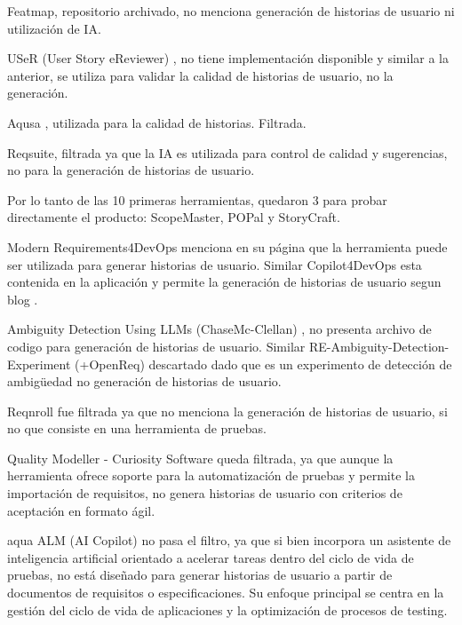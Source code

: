 Featmap, \cite{featmap} repositorio archivado, no menciona generación de historias de usuario ni utilización de IA.

USeR (User Story eReviewer) \cite{user}, no tiene implementación disponible y similar a la anterior, se utiliza para validar la calidad de historias de usuario, no la generación.

Aqusa \cite{aqusa}, utilizada para la calidad de historias. Filtrada.

Reqsuite, filtrada ya que la IA es utilizada para control de calidad y sugerencias, no para la generación de historias de usuario.

Por lo tanto de las 10 primeras herramientas, quedaron 3 para probar directamente el producto: ScopeMaster, POPal y StoryCraft.

Modern Requirements4DevOps \cite{modernreq1} menciona en su página \cite{modernreq2} que la herramienta puede ser utilizada para generar historias de usuario. Similar Copilot4DevOps \cite{copilotfordevops1} esta contenida en la aplicación y permite la generación de historias de usuario segun blog \cite{copilotfordevops2}.

Ambiguity Detection Using LLMs (ChaseMc-Clellan) \cite{ambiguitydect}, no presenta archivo de codigo para generación de historias de usuario. Similar RE-Ambiguity-Detection-Experiment (+OpenReq) \cite{reambiguity} descartado dado que es un experimento de detección de ambigüedad no generación de historias de usuario.

Reqnroll \cite{reqnroll} fue filtrada ya que no menciona la generación de historias de usuario, si no que consiste en una herramienta de pruebas.

Quality Modeller - Curiosity Software \cite{qualityModeller} queda filtrada, ya que aunque la herramienta ofrece soporte para la automatización de pruebas y permite la importación de requisitos, no genera historias de usuario con criterios de aceptación en formato ágil.

aqua ALM (AI Copilot) \cite{aquaalm} no pasa el filtro, ya que si bien incorpora un asistente de inteligencia artificial orientado a acelerar tareas dentro del ciclo de vida de pruebas, no está diseñado para generar historias de usuario a partir de documentos de requisitos o especificaciones. Su enfoque principal se centra en la gestión del ciclo de vida de aplicaciones y la optimización de procesos de testing.

